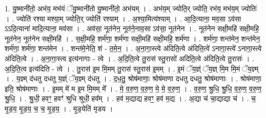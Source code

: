 \documentclass[17pt]{extarticle}
\begin{document}
1. यु॒ष्मानी॑तो॒ अभ॑य॒ मभ॑यं ॅयु॒ष्मानी॑तो यु॒ष्मानी॑तो॒ अभ॑यम् । . अभ॑य॒म् ज्योति॒र् ज्योति॒ रभ॑य॒ मभ॑य॒म् ज्योतिः॑ । . ज्योति॑ रश्या मश्या॒म् ज्योति॒र् ज्योति॑ रश्याम् । . अ॒श्या॒मित्य॑श्याम् । . आ॒दि॒त्याना॒ मव॒सा ऽव॑सा ऽऽदि॒त्याना॑ मादि॒त्याना॒ मव॑सा । . अव॑सा॒ नूत॑नेन॒ नूत॑ने॒नाव॒सा ऽव॑सा॒ नूत॑नेन । . नूत॑नेन सक्षी॒महि॑ सक्षी॒महि॒ नूत॑नेन॒ नूत॑नेन सक्षी॒महि॑ । . स॒क्षी॒महि॒ शर्म॑णा॒ शर्म॑णा सक्षी॒महि॑ सक्षी॒महि॒ शर्म॑णा । . शर्म॑णा॒ शन्त॑मेन॒ शन्त॑मेन॒ शर्म॑णा॒ शर्म॑णा॒ शन्त॑मेन । . शन्त॑मे॒नेति॒ शं - त॒मे॒न॒ । . अ॒ना॒गा॒स्त्वे अ॑दिति॒त्वे अ॑दिति॒त्वे॑ ऽनागा॒स्त्वे॑ ऽनागा॒स्त्वे अ॑दिति॒त्वे । . अ॒ना॒गा॒स्त्व इत्य॑नागाः - त्वे । . अ॒दि॒ति॒त्वे तु॒रास॑ स्तु॒रासो॑ अदिति॒त्वे अ॑दिति॒त्वे तु॒रासः॑ । . अ॒दि॒ति॒त्व इत्य॑दिति - त्वे । . तु॒रास॑ इ॒म मि॒मम् तु॒रास॑ स्तु॒रास॑ इ॒मम् । . इ॒मं ॅय॒ज्ञ्ं ॅय॒ज्ञ् मि॒म मि॒मं ॅय॒ज्ञ्म् । . य॒ज्ञ्म् द॑धतु दधतु य॒ज्ञ्ं ॅय॒ज्ञ्म् द॑धतु । . द॒ध॒तु॒ श्रोष॑माणाः॒ श्रोष॑माणा दधतु दधतु॒ श्रोष॑माणाः । . श्रोष॑माणा॒ इति॒ श्रोष॑माणाः । . इ॒मम् मे॑ म इ॒म मि॒मम् मे᳚ । . मे॒ व॒रु॒ण॒ व॒रु॒ण॒ मे॒ मे॒ व॒रु॒ण॒ । . व॒रु॒ण॒ श्रु॒धि॒ श्रु॒धि॒ व॒रु॒ण॒ व॒रु॒ण॒ श्रु॒धि॒ । . श्रु॒धी॒ हवꣳ॒॒ हवꣳ॑ श्रुधि श्रुधी॒ हव᳚म् । . हव॑ म॒द्याद्य हवꣳ॒॒ हव॑ म॒द्य । . अ॒द्या च॑ चा॒द्याद्या च॑ । . च॒ मृ॒ड॒य॒ मृ॒ड॒य॒ च॒ च॒ मृ॒ड॒य॒ । . मृ॒ड॒येति॑ मृडय । \newline
\end{document}
